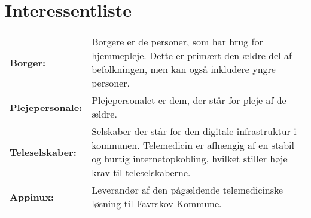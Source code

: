 \documentclass[10pt,a4paper]{article}
\begin{document}
\section{Interessentliste}
\begin{tabular}{p{3cm}p{11cm}}
\textbf{Borger:} & Borgere er de personer, som har brug for hjemmepleje. Dette er primært den ældre del af befolkningen, men kan også inkludere yngre personer.\\ 

\textbf{Plejepersonale:} & Plejepersonalet er dem, der står for pleje af de ældre. \\

\textbf{Teleselskaber:} & Selskaber der står for den digitale infrastruktur i kommunen. Telemedicin er afhængig af en stabil og hurtig internetopkobling, hvilket stiller høje krav til teleselskaberne.\\

\textbf{Appinux:} & Leverandør af den pågældende telemedicinske løsning til Favrskov Kommune.
\end{tabular}
\end{document}
